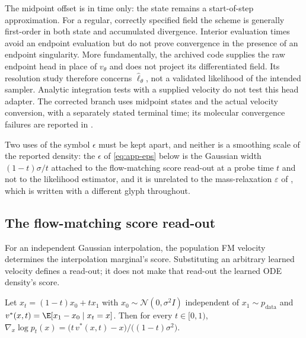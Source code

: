 The midpoint offset is in time only: the state remains a start-of-step
approximation. For a regular, correctly specified field the scheme is generally
first-order in both state and accumulated divergence. Interior evaluation times
avoid an endpoint evaluation but do not prove convergence in the presence of an
endpoint singularity. More fundamentally, the archived code supplies the raw
endpoint head in place of $v_\theta$ and does not project its differentiated field.
Its resolution study therefore concerns $\widehat\ell_\theta$, not a validated
likelihood of the intended sampler. Analytic integration tests with a supplied
velocity do not test this head adapter. The corrected branch uses midpoint states
and the actual velocity conversion, with a separately stated terminal time;
its molecular convergence failures are reported in .

Two uses of the symbol $\epsilon$ must be kept apart, and neither is a smoothing
scale of the reported density: the $\epsilon$ of \eqref{eq:app-eps} below is the
Gaussian width $(1-t)\sigma/t$ attached to the flow-matching score read-out at a
probe time $t$ and not to the likelihood estimator, and it is unrelated to the
mass-relaxation $\varepsilon$ of , which is written with a
different glyph throughout.

\subsection{The flow-matching score read-out}
\label{app:score}

For an independent Gaussian interpolation, the population FM velocity determines
the interpolation marginal's score. Substituting an arbitrary learned velocity
defines a read-out; it does not make that read-out the learned ODE density's score.

\begin{lemma}
\label{lem:score}
Let $x_t = (1-t)x_0 + t x_1$ with $x_0 \sim \mathcal{N}(0,\sigma^2 I)$ independent of
$x_1 \sim p_{\mathrm{data}}$ and $v^{*}(x,t) = \E[x_1 - x_0 \mid x_t = x]$. Then for every
$t \in [0,1)$, $\nabla_x \log p_t(x) = \bigl(t\,v^{*}(x,t) - x\bigr)/\bigl((1-t)\sigma^2\bigr)$.
\end{lemma}

